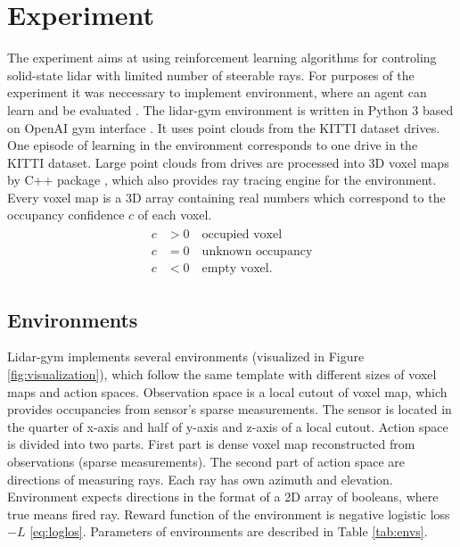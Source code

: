 \section{Experiment}
The experiment aims at using reinforcement learning algorithms for controling solid-state lidar with limited number of steerable rays. For purposes of the experiment it was neccessary to implement environment, where an agent can learn and be evaluated \cite{rozsypalek2018}. The lidar-gym environment is written in Python 3 based on OpenAI gym interface \cite{openai2016}. It uses point clouds from the KITTI dataset drives\cite{geiger2013}. One episode of learning in the environment corresponds to one drive in the KITTI dataset. Large point clouds from drives are processed into 3D voxel maps by C++ package \cite{petricek2017}, which also provides ray tracing engine for the environment. Every voxel map is a 3D array containing real numbers which correspond to the occupancy confidence $c$ of each voxel.
\begin{align}
\begin{split}
c &> 0 \quad \text{occupied voxel} \\
c &= 0 \quad \text{unknown occupancy} \\
c &< 0 \quad \text{empty voxel.}
\end{split}
\end{align}

\subsection{Environments}
Lidar-gym implements several environments (visualized in Figure \ref{fig:visualization}), which follow the same template with different sizes of voxel maps and action spaces. Observation space is a local cutout of voxel map, which provides occupancies from sensor's sparse measurements. The sensor is located in the quarter of x-axis and half of y-axis and z-axis of a local cutout. Action space is divided into two parts. First part is dense voxel map reconstructed from observations (sparse measurements). The second part of action space are directions of measuring rays. Each ray has own azimuth and elevation. Environment expects directions in the format of a 2D array of booleans, where true means fired ray. Reward function of the environment is negative logistic loss $-L$ \eqref{eq:loglos}. Parameters of environments are described in Table \ref{tab:envs}.

